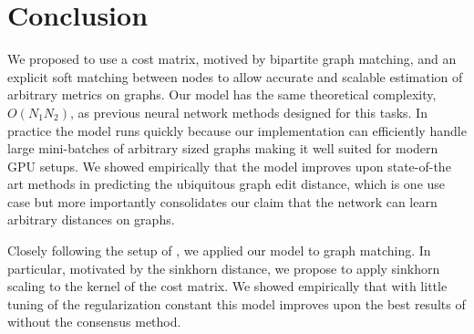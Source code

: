 \section{Conclusion}


We proposed to use a cost matrix, motived by bipartite graph matching, and an explicit soft matching between nodes to allow accurate and scalable estimation of arbitrary metrics on graphs. Our model has the same theoretical complexity, $O(N_1 N_2)$, as previous neural network methods designed for this tasks. In practice the model runs quickly because our implementation can efficiently handle large mini-batches of arbitrary sized graphs making it well suited for modern GPU setups. We showed empirically that the model improves upon state-of-the art methods in predicting the ubiquitous graph edit distance, which is one use case but more importantly consolidates our claim that the network can learn arbitrary distances on graphs.



Closely following the setup of \cite{fey2020_update}, we applied our  model to graph matching. In particular, motivated by the sinkhorn distance, we propose to apply sinkhorn scaling to the kernel of the cost matrix. We showed empirically that with little tuning of the regularization constant this model improves upon the best results of \cite{fey2020_update} without the consensus method.

